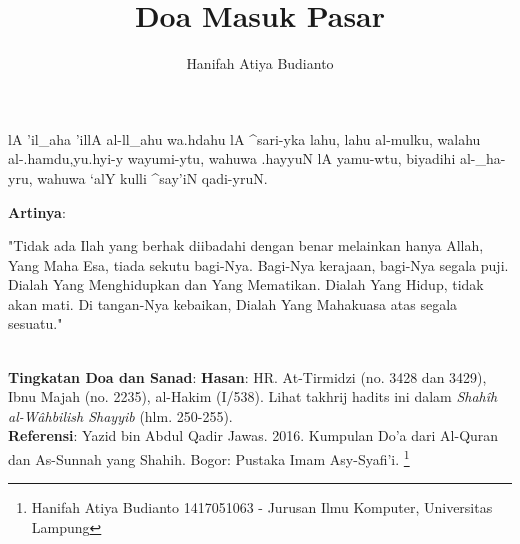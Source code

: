 \documentclass[a4paper,12pt]{article}
\title{\Large Doa Masuk Pasar}
\author{\calligra Hanifah Atiya Budianto}
\begin{document}
\sffamily
\maketitle 
\fullvocalize
{}
\begin{arabtext}
\noindent
lA 'il_aha 'illA al-ll_ahu wa.hdahu lA ^sari-yka lahu, lahu al-mulku, 
walahu al-.hamdu,yu.hyi-y wayumi-ytu, wahuwa .hayyuN lA yamu-wtu, biyadihi 
al-_ha-yru, wahuwa `alY kulli ^say'iN qadi-yruN.\\
\end{arabtext}
\noindent
\textbf{Artinya}:
\par
\indent
"Tidak ada Ilah yang berhak diibadahi dengan benar melainkan hanya Allah, 
Yang Maha Esa, tiada sekutu bagi-Nya. Bagi-Nya kerajaan, bagi-Nya segala 
puji. Dialah Yang Menghidupkan dan Yang Mematikan. Dialah Yang Hidup, tidak
akan mati. Di tangan-Nya kebaikan, Dialah Yang Mahakuasa atas segala 
sesuatu."\\\\
\par
\noindent
\textbf{Tingkatan Doa dan Sanad}: \textbf{Hasan}: HR. At-Tirmidzi (no. 3428
dan 3429), Ibnu Majah (no. 2235), al-Hakim (I/538). Lihat takhrij hadits 
ini dalam \textit{Shah\^{i}h al-W\^{a}hbilish Shayyib} (hlm. 250-255).\\
\textbf{Referensi}: Yazid bin Abdul Qadir Jawas. 2016. Kumpulan Do'a dari
Al-Quran dan As-Sunnah yang Shahih. Bogor: Pustaka Imam Asy-Syafi'i.
\footnote{Hanifah Atiya Budianto 1417051063 - Jurusan Ilmu Komputer,
Universitas Lampung}
\end{document}

